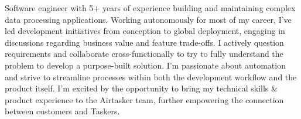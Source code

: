 \begin{justify}
Software engineer with 5+ years of experience building and maintaining complex data processing applications. Working autonomously for most of my career, I've led development initiatives from conception to global deployment, engaging in discussions regarding business value and feature trade-offs. I actively question requirements and collaborate cross-functionally to try to fully understand the problem to develop a purpose-built solution. I'm passionate about automation and strive to streamline processes within both the development workflow and the product itself. I'm excited by the opportunity to bring my technical skills \& product experience to the Airtasker team, further empowering the connection between customers and Taskers.
\end{justify}